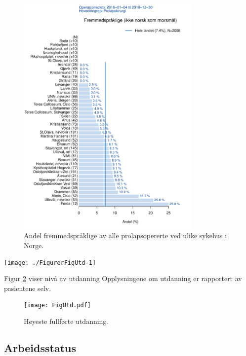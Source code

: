 \documentclass [norsk,a4paper,twoside]{article}\usepackage[]{graphicx}\usepackage[]{color}
\newenvironment{knitrout}{}{} %
\begin{document}
\begin{figure}[ht]
	\centering \includegraphics[width= 0.8\textwidth]{FigMorsmal.pdf}
	\caption{\label{fig:Morsmal} Andel fremmedspråklige av alle prolapsopererte ved ulike sykehus i
Norge.}
\end{figure}


\begin{knitrout}
\color{fgcolor}

{\centering \texttt{[image: ./FigurerFigUtd-1]} 

}



\end{knitrout}

Figur \ref{fig:Utd} viser nivå av utdanning 
Opplysningene om utdanning er rapportert av pasientene selv.

\begin{figure}[ht]
	\centering \texttt{[image: FigUtd.pdf]}
	\caption{\label{fig:Utd} Høyeste fullførte utdanning.}
\end{figure}




\subsection{Arbeidsstatus}
\end{document}
